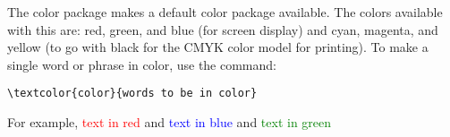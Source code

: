 \documentclass{article}
\begin{document}
The color package makes a default color package available. 
The colors available with this are: red, green, and blue (for screen display) 
and cyan, magenta, and yellow (to go with black for the CMYK color model for printing). 
To make a single word or phrase in color, use the command: 

\begin{center}
\verb#\textcolor{color}{words to be in color}#
\end{center}

For example, \textcolor{red}{text in red} and \textcolor{blue}{text in blue}
and \textcolor{green}{text in green}
\end{document}
